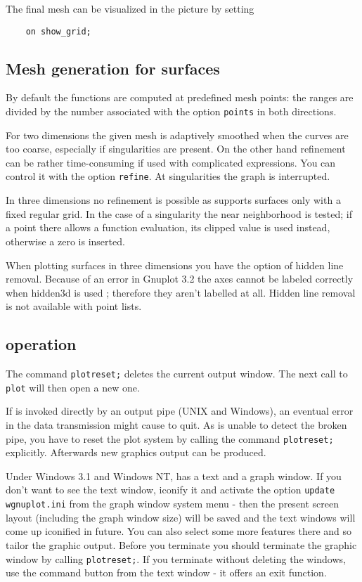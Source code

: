 The final mesh can be visualized in the picture by setting
\begin{verbatim}
    on show_grid;
\end{verbatim}


\subsection{Mesh generation for surfaces}

By default the functions are computed at predefined mesh points: the ranges are
divided by the number associated with the option \texttt{points} in both
directions.

For two dimensions the given mesh is adaptively smoothed when the curves are too
coarse, especially if singularities are present. On the other hand refinement
can be rather time-consuming if used with complicated expressions. You can
control it with the option \texttt{refine}.  At singularities the graph is
interrupted.

In three dimensions no refinement is possible as {\Gnuplot} supports surfaces only
with a fixed regular grid. In the case of a singularity the near neighborhood is
tested; if a point there allows a function evaluation, its clipped value is used
instead, otherwise a zero is inserted.

When plotting surfaces in three dimensions you have the option of hidden line
removal. Because of an error in Gnuplot 3.2 the axes cannot be labeled correctly
when hidden3d is used ; therefore they aren't labelled at all.  Hidden line
removal is not available with point lists.


\subsection{{\Gnuplot} operation}

The command \texttt{plotreset;} deletes the current {\Gnuplot} output
window. The next call to \texttt{plot} will then open a new one.

If {\Gnuplot} is invoked directly by an output pipe (UNIX and Windows), an eventual
error in the {\Gnuplot} data transmission might cause {\Gnuplot} to quit. As {\REDUCE}
is unable to detect the broken pipe, you have to reset the plot system by
calling the command \texttt{plotreset;} explicitly. Afterwards new graphics
output can be produced.

Under Windows 3.1 and Windows NT, {\Gnuplot} has a text and a graph window.  If you
don't want to see the text window, iconify it and activate the
option \texttt{update wgnuplot.ini} from the graph window system menu - then the
present screen layout (including the graph window size) will be saved and the
text windows will come up iconified in future.  You can also select some more
features there and so tailor the graphic output.  Before you terminate {\REDUCE}
you should terminate the graphic window by calling \texttt{plotreset;}.  If you
terminate {\REDUCE} without deleting the {\Gnuplot} windows, use the command button
from the {\Gnuplot} text window - it offers an exit function.


